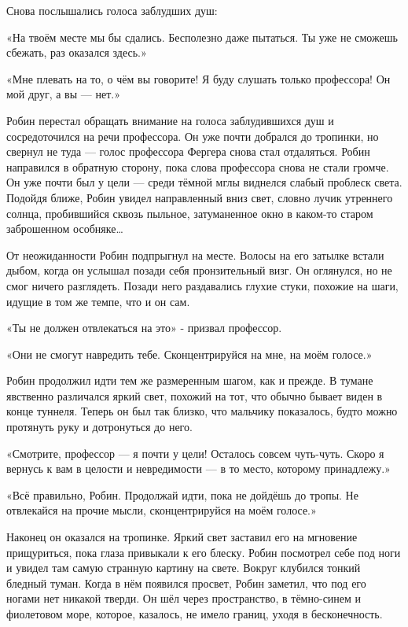 \documentclass[a4paper,12pt]{book}
\begin{document}
\par
Снова послышались голоса заблудших душ:
\par
«На твоём месте мы бы сдались. Бесполезно даже пытаться. Ты уже не сможешь сбежать, раз оказался здесь.»
\par
«Мне плевать на то, о чём вы говорите! Я буду слушать только профессора! Он мой друг, а вы — нет.»\\
\par
Робин перестал обращать внимание на голоса заблудившихся душ и сосредоточился на речи профессора. Он уже почти добрался до тропинки, но свернул не туда — голос профессора Фергера снова стал отдаляться. Робин направился в обратную сторону, пока слова профессора снова не стали громче. Он уже почти был у цели — среди тёмной мглы виднелся слабый проблеск света. Подойдя ближе, Робин увидел направленный вниз свет, словно лучик утреннего солнца, пробившийся сквозь пыльное, затуманенное окно в каком-то старом заброшенном особняке…
\par
От неожиданности Робин подпрыгнул на месте. Волосы на его затылке встали дыбом, когда он услышал позади себя пронзительный визг. Он оглянулся, но не смог ничего разглядеть. Позади него раздавались глухие стуки, похожие на шаги, идущие в том же темпе, что и он сам.
\par
«Ты не должен отвлекаться на это» - призвал профессор.
\par
«Они не смогут навредить тебе. Сконцентрируйся на мне, на моём голосе.»
\par
Робин продолжил идти тем же размеренным шагом, как и прежде. В тумане явственно различался яркий свет, похожий на тот, что обычно бывает виден в конце туннеля. Теперь он был так близко, что мальчику показалось, будто можно протянуть руку и дотронуться до него.
\par
«Смотрите, профессор — я почти у цели! Осталось совсем чуть-чуть. Скоро я вернусь к вам в целости и невредимости — в то место, которому принадлежу.»
\par
«Всё правильно, Робин. Продолжай идти, пока не дойдёшь до тропы. Не отвлекайся на прочие мысли, сконцентрируйся на моём голосе.»\\
\par
Наконец он оказался на тропинке. Яркий свет заставил его на мгновение прищуриться, пока глаза привыкали к его блеску. Робин посмотрел себе под ноги и увидел там самую странную картину на свете. Вокруг клубился тонкий бледный туман. Когда в нём появился просвет, Робин заметил, что под его ногами нет никакой тверди. Он шёл через пространство, в тёмно-синем и фиолетовом море, которое, казалось, не имело границ, уходя в бесконечность.
\end{document}
